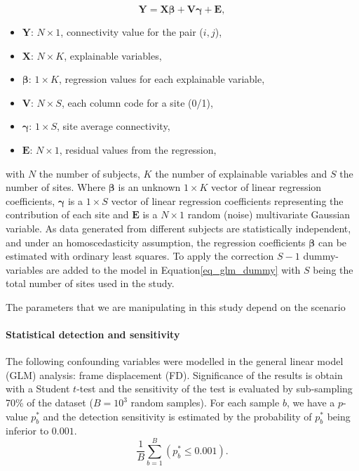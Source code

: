 \documentclass[authoryear]{elsarticle}
\begin{document}
\begin{equation}
 \label{eq_glm_dummy}
  \mathbf{Y} = \mathbf{X}\mathbf{\beta} + \mathbf{V}\mathbf{\gamma}+ \mathbf{E},
\end{equation}
\begin{itemize}
  \item $\mathbf{Y}$: $N\times 1$, connectivity value for the pair ($i,j$),
  \item $\mathbf{X}$: $N\times K$, explainable variables,
  \item $\mathbf{\beta}$: $1 \times K$, regression values for each explainable variable,
  \item $\mathbf{V}$: $N\times S$, each column code for a site (0/1),
  \item $\mathbf{\gamma}$: $1\times S$, site average connectivity,
  \item $\mathbf{E}$: $N\times 1$, residual values from the regression,
\end{itemize}
 
with $N$ the number of subjects, $K$ the number of explainable variables and $S$ the number of sites. Where $\mathbf{\beta}$ is an unknown $1\times K$ vector of linear regression coefficients, $\mathbf{\gamma}$ is a $1\times S$ vector of linear regression coefficients representing the contribution of each site and $\mathbf{E}$ is a $N\times 1$ random (noise) multivariate Gaussian variable. As data generated from different subjects are statistically independent, and under an homoscedasticity assumption, the regression coefficients $\mathbf{\beta}$ can be estimated with ordinary least squares. To apply the correction $S-1$ dummy-variables are added to the model in Equation\ref{eq_glm_dummy} with $S$ being the total number of sites used in the study.


The parameters that we are manipulating in this study depend on the scenario 

\paragraph{Statistical detection  and sensitivity}
The following confounding variables were modelled in the general linear model (GLM) analysis: frame displacement (FD). Significance of the results is obtain with a Student $t$-test and the sensitivity of the test is evaluated by sub-sampling 70\% of the dataset ($B=10^3$ random samples). For each sample $b$, we have a $p$-value $p^{*}_b$ and the detection sensitivity is estimated by the probability of $p^{*}_b$ being inferior to $0.001$.
\begin{equation}\label{Detection power}  
    \frac{1}{B}\sum\limits_{b=1}^B\left(p^{*}_b\leq0.001\right).
\end{equation}
\end{document}
